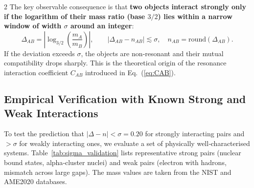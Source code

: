 \documentclass[11pt,a4paper]{article}
\begin{document}
\begin{multicols}{2}
The key observable consequence is that \textbf{two objects interact strongly only if the logarithm of their mass ratio (base \(3/2\)) lies within a narrow window of width $\sigma$ around an integer}:
\[
\Delta_{AB} = \left| \log_{3/2}\left( \frac{m_A}{m_B} \right) \right|,\qquad
|\Delta_{AB} - n_{AB}| \lesssim \sigma,\quad n_{AB} = \text{round}(\Delta_{AB}).
\]
If the deviation exceeds $\sigma$, the objects are non‑resonant and their mutual compatibility drops sharply. This is the theoretical origin of the resonance interaction coefficient \(C_{AB}\) introduced in Eq.~(\ref{eq:CAB}).

\subsection{Empirical Verification with Known Strong and Weak Interactions}

To test the prediction that $|\Delta - n| < \sigma = 0.20$ for strongly interacting pairs and $> \sigma$ for weakly interacting ones, we evaluate a set of physically well‑characterised systems. Table~\ref{tab:sigma_validation} lists representative strong pairs (nuclear bound states, alpha‑cluster nuclei) and weak pairs (electron with hadrons, mismatch across large gaps). The mass values are taken from the NIST and AME2020 databases.


\end{multicols}
\end{document}
